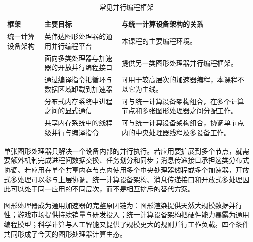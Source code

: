 \begin{table}[H]
\centering
\caption{常见并行编程框架}
\begin{tabularx}{\textwidth}{L{0.22\textwidth}L{0.30\textwidth}Y}
\toprule
\textbf{框架} & \textbf{主要目标} & \textbf{与统一计算设备架构的关系} \\
\midrule
统一计算设备架构 & 英伟达图形处理器的通用并行编程平台 & 本课程的主要编程环境。 \\
 & 面向多类处理器与加速器的开放并行编程接口 & 提供另一类图形处理器并行编程框架。 \\
 & 通过编译指令把循环与数据区域卸载到加速器 & 可用于较高层次的加速器编程，本课程不以它为主线。 \\
 & 分布式内存系统中进程之间的显式通信 & 可与统一计算设备架构组合，在多个计算节点和多张图形处理器之间分配工作。 \\
 & 共享内存系统中的线程级并行与编译指令 & 可与统一计算设备架构组合，协调单节点内的中央处理器线程及多设备工作。 \\
\bottomrule
\end{tabularx}
\end{table}

单张图形处理器只解决一个设备内部的并行执行。若应用要扩展到多个节点，就需要额外机制完成进程间数据交换、任务划分和同步；消息传递接口承担这类分布式协调。若应用在单个共享内存节点内使用多个中央处理器线程或多个加速器，开放式多处理可以参与上层协调。统一计算设备架构、消息传递接口和开放式多处理因此可以处于同一应用的不同层次，而不是相互排斥的替代方案。

\begin{keybox}
图形处理器成为通用加速器的完整原因链为：图形渲染提供天然大规模数据并行性；游戏市场提供持续销量与研发投入；统一计算设备架构把硬件能力暴露为通用编程模型；科学计算与人工智能又提供了规模更大的规则并行工作负载。四个条件共同形成了今天的图形处理器计算生态。
\end{keybox}
